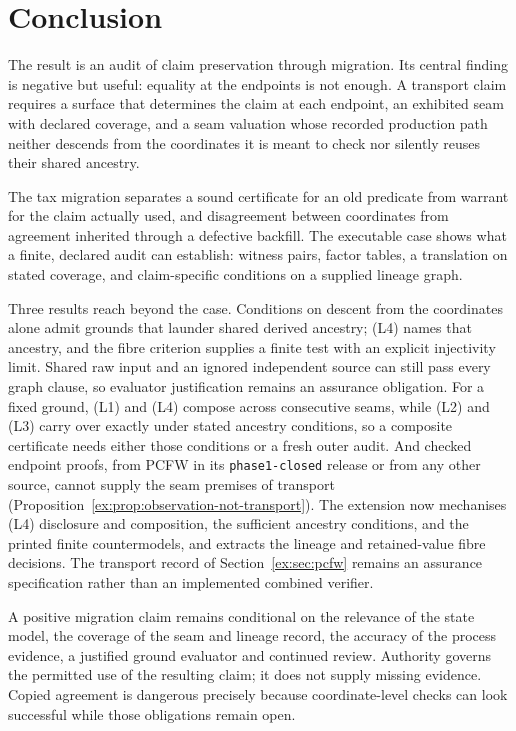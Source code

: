 \documentclass[11pt]{article}
\theoremstyle{definition}
\newcommand{\code}[1]{\texttt{#1}}
\begin{document}
\section{Conclusion}\label{ex:sec:conclusion}
The result is an audit of claim preservation through migration. Its central finding is negative but useful: equality at the endpoints is not enough. A transport claim requires a surface that determines the claim at each endpoint, an exhibited seam with declared coverage, and a seam valuation whose recorded production path neither descends from the coordinates it is meant to check nor silently reuses their shared ancestry.

The tax migration separates a sound certificate for an old predicate from warrant for the claim actually used, and disagreement between coordinates from agreement inherited through a defective backfill. The executable case shows what a finite, declared audit can establish: witness pairs, factor tables, a translation on stated coverage, and claim-specific conditions on a supplied lineage graph.

Three results reach beyond the case. Conditions on descent from the coordinates alone admit grounds that launder shared derived ancestry; (L4) names that ancestry, and the fibre criterion supplies a finite test with an explicit injectivity limit. Shared raw input and an ignored independent source can still pass every graph clause, so evaluator justification remains an assurance obligation. For a fixed ground, (L1) and (L4) compose across consecutive seams, while (L2) and (L3) carry over exactly under stated ancestry conditions, so a composite certificate needs either those conditions or a fresh outer audit. And checked endpoint proofs, from PCFW in its \code{phase1-closed} release or from any other source, cannot supply the seam premises of transport (Proposition~\ref{ex:prop:observation-not-transport}). The extension now mechanises (L4) disclosure and composition, the sufficient ancestry conditions, and the printed finite countermodels, and extracts the lineage and retained-value fibre decisions. The transport record of Section~\ref{ex:sec:pcfw} remains an assurance specification rather than an implemented combined verifier.

A positive migration claim remains conditional on the relevance of the state model, the coverage of the seam and lineage record, the accuracy of the process evidence, a justified ground evaluator and continued review. Authority governs the permitted use of the resulting claim; it does not supply missing evidence. Copied agreement is dangerous precisely because coordinate-level checks can look successful while those obligations remain open.
\end{document}
